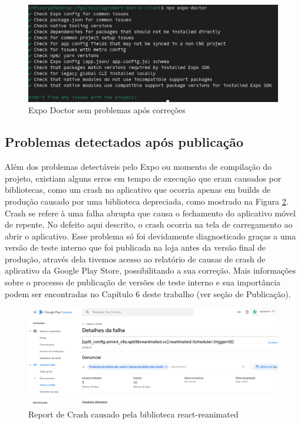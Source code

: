 \begin{figure}[h]
	\centering
	\includegraphics[keepaspectratio=true,scale=0.4]{figuras/doctor-success.jpeg}
	\caption{Expo Doctor sem problemas após correções}
	\label{doctor-success}
\end{figure}

\subsection{Problemas detectados após publicação}

Além dos problemas detectáveis pelo Expo ou momento de compilação do projeto, existiam alguns erros em tempo de execução que eram causados por bibliotecas, como um crash no aplicativo que ocorria apenas em builds de produção causado por uma biblioteca depreciada, como mostrado na Figura \ref{react-reanimated-crash}.
Crash se refere à uma falha abrupta que causa o fechamento do aplicativo móvel de repente. No defeito aqui descrito, o crash ocorria na tela de carregamento ao abrir o aplicativo. Esse problema só foi devidamente diagnosticado graças a uma versão de teste interno que foi publicada na loja antes da versão final de produção, através dela tivemos acesso ao relatório de causas de crash de aplicativo da Google Play Store, possibilitando a sua correção.
Mais informações sobre o processo de publicação de versões de teste interno e sua importância podem ser encontradas no Capítulo 6 deste trabalho (ver seção de Publicação).

\begin{figure}[h]
	\centering
	\includegraphics[keepaspectratio=true,scale=0.4]{figuras/react-reanimated-crash.png}
	\caption{Report de Crash causado pela biblioteca react-reanimated}
	\label{react-reanimated-crash}
\end{figure}


